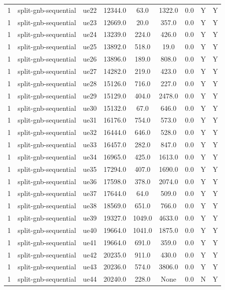 \begin{table}[ht]
\begin{tabular}{|c|c|c|c|c|c|c|c|c|}
1 & split-gnb-sequential & ue22 & 12344.0 & 63.0 & 1322.0 & 0.0 & Y & Y \\
1 & split-gnb-sequential & ue23 & 12669.0 & 20.0 & 357.0 & 0.0 & Y & Y \\
1 & split-gnb-sequential & ue24 & 13239.0 & 224.0 & 426.0 & 0.0 & Y & Y \\
1 & split-gnb-sequential & ue25 & 13892.0 & 518.0 & 19.0 & 0.0 & Y & Y \\
1 & split-gnb-sequential & ue26 & 13896.0 & 189.0 & 808.0 & 0.0 & Y & Y \\
1 & split-gnb-sequential & ue27 & 14282.0 & 219.0 & 423.0 & 0.0 & Y & Y \\
1 & split-gnb-sequential & ue28 & 15126.0 & 716.0 & 227.0 & 0.0 & Y & Y \\
1 & split-gnb-sequential & ue29 & 15129.0 & 404.0 & 2478.0 & 0.0 & Y & Y \\
1 & split-gnb-sequential & ue30 & 15132.0 & 67.0 & 646.0 & 0.0 & Y & Y \\
1 & split-gnb-sequential & ue31 & 16176.0 & 754.0 & 573.0 & 0.0 & Y & Y \\
1 & split-gnb-sequential & ue32 & 16444.0 & 646.0 & 528.0 & 0.0 & Y & Y \\
1 & split-gnb-sequential & ue33 & 16457.0 & 282.0 & 847.0 & 0.0 & Y & Y \\
1 & split-gnb-sequential & ue34 & 16965.0 & 425.0 & 1613.0 & 0.0 & Y & Y \\
1 & split-gnb-sequential & ue35 & 17294.0 & 407.0 & 1690.0 & 0.0 & Y & Y \\
1 & split-gnb-sequential & ue36 & 17598.0 & 378.0 & 2074.0 & 0.0 & Y & Y \\
1 & split-gnb-sequential & ue37 & 17644.0 & 64.0 & 509.0 & 0.0 & Y & Y \\
1 & split-gnb-sequential & ue38 & 18569.0 & 651.0 & 766.0 & 0.0 & Y & Y \\
1 & split-gnb-sequential & ue39 & 19327.0 & 1049.0 & 4633.0 & 0.0 & Y & Y \\
1 & split-gnb-sequential & ue40 & 19664.0 & 1041.0 & 1875.0 & 0.0 & Y & Y \\
1 & split-gnb-sequential & ue41 & 19664.0 & 691.0 & 359.0 & 0.0 & Y & Y \\
1 & split-gnb-sequential & ue42 & 20235.0 & 911.0 & 430.0 & 0.0 & Y & Y \\
1 & split-gnb-sequential & ue43 & 20236.0 & 574.0 & 3806.0 & 0.0 & Y & Y \\
1 & split-gnb-sequential & ue44 & 20240.0 & 228.0 & None & 0.0 & N & Y \\

\end{tabular}
\end{table}
